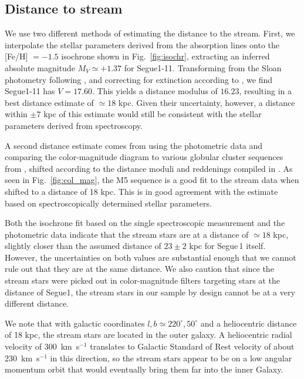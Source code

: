 \documentclass[manuscript]{aastex}
\begin{document}
\subsection{Distance to stream}

We use two different methods of estimating the distance to the stream. First, we interpolate the stellar parameters derived from the absorption lines onto the [Fe/H] $= -1.5$ isochrone shown in Fig.~\ref{fig:isochr}, extracting an inferred absolute magnitude $M_V \simeq +1.37$ for Segue1-11. Transforming from the Sloan photometry following \citet{Jordi2006}, and correcting for extinction according to \citet{Schlegel1998}, we find Segue1-11 has $V = 17.60$. This yields a distance modulus of $16.23$, resulting in a best distance estimate of $\simeq 18$ kpc. Given their uncertainty, however, a distance within $\pm 7$ kpc of this estimate would still be consistent with the stellar parameters derived from spectroscopy.


A second distance estimate comes from using the photometric data and comparing the color-magnitude diagram to various globular cluster sequences from \citet{An2008}, shifted according to the distance moduli and reddenings compiled in \citet{Harris1996}. As seen in Fig.~\ref{fig:col_mag}, the M5 sequence is a good fit to the stream data when shifted to a distance of 18 kpc. This is in good agreement with the estimate based on spectroscopically determined stellar parameters.

Both the isochrone fit based on the single spectroscopic measurement and the photometric data indicate that the stream stars are at a distance of $\simeq 18$ kpc, slightly closer than the assumed distance of $23 \pm 2$ kpc \citep{Belokurov2007} for Segue\,1 itself. However, the uncertainties on both values are substantial enough that we cannot rule out that they are at the same distance. We also caution that since the stream stars were picked out in color-magnitude filters targeting stars at the distance of Segue1, the stream stars in our sample by design cannot be at a very different distance. 

We note that with galactic coordinates $l, b \simeq 220^{\circ}, 50^{\circ}$ and a heliocentric distance of 18 kpc, the stream stars are located in the outer galaxy. A heliocentric radial velocity of 300~km~s$^{-1}$ translates to Galactic Standard of Rest velocity of about 230~km~s$^{-1}$ in this direction, so the stream stars appear to be on a low angular momentum orbit that would eventually bring them far into the inner Galaxy.
\end{document}
